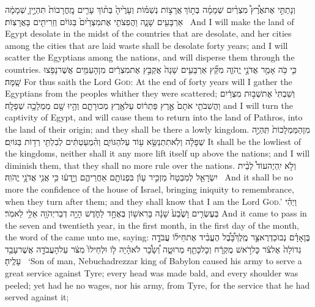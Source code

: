 {וְנָתַתִּ֣י אֶת\maqqaf אֶ֩רֶץ֩ מִצְרַ֨יִם שְׁמָמָ֜ה בְּת֣וֹךְ \legarmeh  אֲרָצ֣וֹת נְשַׁמּ֗וֹת וְעָרֶ֙יהָ֙ בְּת֨וֹךְ עָרִ֤ים מׇֽחֳרָבוֹת֙ תִּהְיֶ֣יןָ שְׁמָמָ֔ה אַרְבָּעִ֖ים שָׁנָ֑ה וַהֲפִצֹתִ֤י אֶת\maqqaf מִצְרַ֙יִם֙ בַּגּוֹיִ֔ם וְזֵרִיתִ֖ים בָּאֲרָצֽוֹת׃ \setuma }
{And I will make the land of Egypt desolate in the midst of the countries that are desolate, and her cities among the cities that are laid waste shall be desolate forty years; and I will scatter the Egyptians among the nations, and will disperse them through the countries.}
{כִּ֛י כֹּ֥ה אָמַ֖ר אֲדֹנָ֣י יֱהֹוִ֑ה מִקֵּ֞ץ אַרְבָּעִ֤ים שָׁנָה֙ אֲקַבֵּ֣ץ אֶת\maqqaf מִצְרַ֔יִם מִן\maqqaf הָעַמִּ֖ים אֲשֶׁר\maqqaf נָפֹ֥צוּ שָֽׁמָּה׃}
{For thus saith the Lord \textsc{God}: At the end of forty years will I gather the Egyptians from the peoples whither they were scattered;}
{וְשַׁבְתִּי֙ אֶת\maqqaf שְׁב֣וּת מִצְרַ֔יִם וַהֲשִׁבֹתִ֤י אֹתָם֙ אֶ֣רֶץ פַּתְר֔וֹס עַל\maqqaf אֶ֖רֶץ מְכוּרָתָ֑ם וְהָ֥יוּ שָׁ֖ם מַמְלָכָ֥ה שְׁפָלָֽה׃}
{and I will turn the captivity of Egypt, and will cause them to return into the land of Pathros, into the land of their origin; and they shall be there a lowly kingdom.}
{מִן\maqqaf הַמַּמְלָכוֹת֙ תִּֽהְיֶ֣ה שְׁפָלָ֔ה וְלֹֽא\maqqaf תִתְנַשֵּׂ֥א ע֖וֹד עַל\maqqaf הַגּוֹיִ֑ם וְהִ֨מְעַטְתִּ֔ים לְבִלְתִּ֖י רְד֥וֹת בַּגּוֹיִֽם׃}
{It shall be the lowliest of the kingdoms, neither shall it any more lift itself up above the nations; and I will diminish them, that they shall no more rule over the nations.}
{וְלֹ֣א יִֽהְיֶה\maqqaf עוֹד֩ לְבֵ֨ית יִשְׂרָאֵ֤ל לְמִבְטָח֙ מַזְכִּ֣יר עָוֺ֔ן בִּפְנוֹתָ֖ם אַחֲרֵיהֶ֑ם וְיָ֣דְע֔וּ כִּ֥י אֲנִ֖י אֲדֹנָ֥י יֱהֹוִֽה׃ \petucha }
{And it shall be no more the confidence of the house of Israel, bringing iniquity to remembrance, when they turn after them; and they shall know that I am the Lord \textsc{God}.’}
{וַיְהִ֗י בְּעֶשְׂרִ֤ים וָשֶׁ֙בַע֙ שָׁנָ֔ה בָּרִאשׁ֖וֹן בְּאֶחָ֣ד לַחֹ֑דֶשׁ הָיָ֥ה דְבַר\maqqaf יְהֹוָ֖ה אֵלַ֥י לֵאמֹֽר׃}
{And it came to pass in the seven and twentieth year, in the first month, in the first day of the month, the word of the \lord\space came unto me, saying:}
{בֶּן\maqqaf אָדָ֗ם נְבוּכַדְרֶאצַּ֣ר מֶֽלֶךְ\maqqaf בָּ֠בֶ֠ל הֶעֱבִ֨יד אֶת\maqqaf חֵיל֜וֹ עֲבֹדָ֤ה גְדוֹלָה֙ אֶל\maqqaf צֹ֔ר כׇּל\maqqaf רֹ֣אשׁ מֻקְרָ֔ח וְכׇל\maqqaf כָּתֵ֖ף מְרוּטָ֑ה וְ֠שָׂכָ֠ר לֹא\maqqaf הָ֨יָה ל֤וֹ וּלְחֵילוֹ֙ מִצֹּ֔ר עַל\maqqaf הָעֲבֹדָ֖ה אֲשֶׁר\maqqaf עָבַ֥ד עָלֶֽיהָ׃ \setuma }
{‘Son of man, Nebuchadrezzar king of Babylon caused his army to serve a great service against Tyre; every head was made bald, and every shoulder was peeled; yet had he no wages, nor his army, from Tyre, for the service that he had served against it;}
